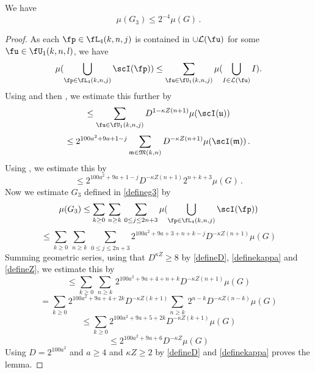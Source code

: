 \begin{lemma}
    \label{third-exception}
    \leanok
       We have
\begin{equation}
    \mu(G_3)\le 2^{-4} \mu(G)\, .
\end{equation}
\end{lemma}
\begin{proof}
\leanok
As each $\fp\in \fL_4(k,n,j)$
is contained in $\cup\mathcal{L}(\fu)$ for some
$\fu\in \fU_1(k,n,l)$, we have
\begin{equation}
\mu(\bigcup_{\fp \in \fL_4 (k,n,j)}\scI(\fp))
\le \sum_{\fu\in \fU_1(k,n,j)}
\mu(\bigcup_{I \in \mathcal{L} (\fu)}I).
\end{equation}
Using  and then , we estimate this further
 by
\begin{equation}
    \le \sum_{\fu\in \fU_1(k,n,j)}
    D^{1-\kappa Z(n+1)}
        \mu(\scI(\mathfrak{u}))
\end{equation}
\begin{equation}
    \le 2^{100a^2+9a+1-j} \sum_{\mathfrak{m}\in \mathfrak{M}(k,n)}
     D^{-\kappa Z(n+1)}
    \mu(\scI(\mathfrak{m}))\,.
\end{equation}
Using , we estimate this by
  \begin{equation}
     \le
2^{100a^2 + 9a + 1-j} D^{-\kappa Z(n+1)}
     2^{n+k+3}\mu(G)\, .
\end{equation}
Now we estimate $G_3$ defined in \eqref{defineg3} by
\begin{equation}
    \mu(G_3)\le \sum_{k\ge 0}\, \sum_{n \geq k}\,
    \sum_{0\le j\le 2n+3}
    \mu(\bigcup_{\fp \in \fL_4 (k,n,j)}
    \scI(\fp))
\end{equation}
\begin{equation}
    \le \sum_{k\ge 0}\, \sum_{n \geq k}\,
    \sum_{0\le j\le 2n+3}
    2^{100a^2 + 9a + 3 + n + k -j} D^{-\kappa Z(n+1)}\mu(G)
\end{equation}
Summing geometric series, using that $D^{\kappa Z}\ge 8$ by \eqref{defineD}, \eqref{definekappa} and \eqref{defineZ}, we estimate this by
\begin{equation}
    \le \sum_{k\ge 0}\, \sum_{n \geq k}\,
    2^{100a^2 + 9a + 4 + n + k} D^{-\kappa Z(n+1)}\mu(G)
\end{equation}
\begin{equation}
    = \sum_{k\ge 0} 2^{100a^2 + 9a + 4 + 2k} D^{-\kappa Z(k+1)} \sum_{n \geq k}\,
    2^{n - k} D^{-\kappa Z(n-k)}\mu(G)
\end{equation}
\begin{equation}
    \le \sum_{k\ge 0} 2^{100a^2 + 9a + 5 + 2k} D^{-\kappa Z(k+1)}\mu(G)
\end{equation}
\begin{equation}
   \le 2^{100a^2 + 9a + 6} D^{-\kappa Z}\mu(G)
\end{equation}
Using $D = 2^{100a^2}$ and $a \ge 4$ and $\kappa Z \ge 2$ by \eqref{defineD} and \eqref{definekappa} proves the lemma.
\end{proof}

